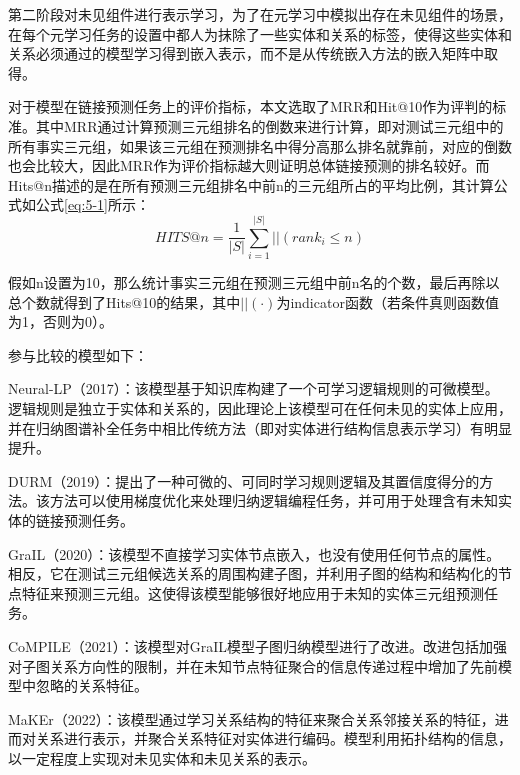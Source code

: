 第二阶段对未见组件进行表示学习，为了在元学习中模拟出存在未见组件的场景，在每个元学习任务的设置中都人为抹除了一些实体和关系的标签，使得这些实体和关系必须通过的模型学习得到嵌入表示，而不是从传统嵌入方法的嵌入矩阵中取得。

对于模型在链接预测任务上的评价指标，本文选取了MRR和Hit@10作为评判的标准。其中MRR通过计算预测三元组排名的倒数来进行计算，即对测试三元组中的所有事实三元组，如果该三元组在预测排名中得分高那么排名就靠前，对应的倒数也会比较大，因此MRR作为评价指标越大则证明总体链接预测的排名较好。而Hits@n描述的是在所有预测三元组排名中前n的三元组所占的平均比例，其计算公式如公式\ref{eq:5-1}所示：
\begin{equation}
  HITS@n = \frac{1}{|S|} \sum_{i=1}^{|S|}||(rank_{i} \leqslant n) \label{eq:5-1}
\end{equation}

假如n设置为10，那么统计事实三元组在预测三元组中前n名的个数，最后再除以总个数就得到了Hits@10的结果，其中\(||(·)\)为indicator函数（若条件真则函数值为1，否则为0）。

参与比较的模型如下：

Neural-LP\cite{yang2017differentiable}（2017）：该模型基于知识库构建了一个可学习逻辑规则的可微模型。逻辑规则是独立于实体和关系的，因此理论上该模型可在任何未见的实体上应用，并在归纳图谱补全任务中相比传统方法（即对实体进行结构信息表示学习）有明显提升。

DURM\cite{sadeghian2019drum}（2019）：提出了一种可微的、可同时学习规则逻辑及其置信度得分的方法。该方法可以使用梯度优化来处理归纳逻辑编程任务，并可用于处理含有未知实体的链接预测任务。

GraIL\cite{teru2020inductive}（2020）：该模型不直接学习实体节点嵌入，也没有使用任何节点的属性。相反，它在测试三元组候选关系的周围构建子图，并利用子图的结构和结构化的节点特征来预测三元组。这使得该模型能够很好地应用于未知的实体三元组预测任务。

CoMPILE\cite{mai2021communicative}（2021）：该模型对GraIL模型子图归纳模型进行了改进。改进包括加强对子图关系方向性的限制，并在未知节点特征聚合的信息传递过程中增加了先前模型中忽略的关系特征。

MaKEr\cite{chen2019meta}（2022）：该模型通过学习关系结构的特征来聚合关系邻接关系的特征，进而对关系进行表示，并聚合关系特征对实体进行编码。模型利用拓扑结构的信息，以一定程度上实现对未见实体和未见关系的表示。

